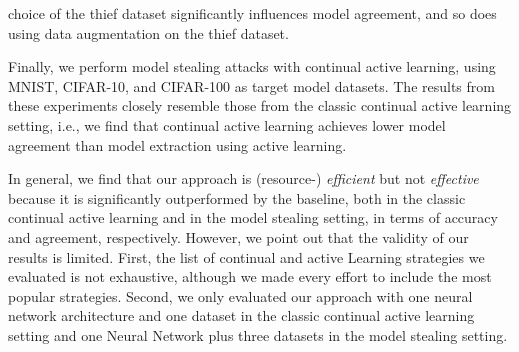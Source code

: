 choice of the thief dataset significantly influences model agreement, and so does using data augmentation on the thief dataset. \par
Finally, we perform model stealing attacks with continual active learning, using MNIST, CIFAR-10, and CIFAR-100 as target model datasets.
The results from these experiments closely resemble those from the classic continual active learning setting, i.e., we find that continual
active learning achieves lower model agreement than model extraction using active learning. \par
In general, we find that our approach is (resource-) \textit{efficient} but not \textit{effective} because it is significantly outperformed
by the baseline, both in the classic continual active learning and in the model stealing setting, in terms of accuracy and agreement,
respectively. However, we point out that the validity of our results is limited. First, the list of continual and active Learning
strategies we evaluated is not exhaustive, although we made every effort to include the most popular strategies. Second, we only evaluated our
approach with one neural network architecture and one dataset in the classic continual active learning setting and one Neural Network
plus three datasets in the model stealing setting.
